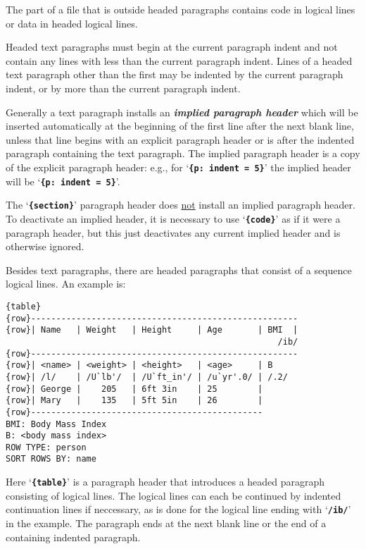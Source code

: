 \documentclass[12pt]{article}
\newcommand{\TT}[1]{{\tt \bfseries #1}}
\newcommand{\lkey}[2]{{\bf \em #1 #2}\index{#1!#2}}
\newenvironment{indpar}[1][0.3in]%
	{\begin{list}{}%
		     {\setlength{\itemsep}{0in}%
		      \setlength{\topsep}{0in}%
		      \setlength{\parsep}{1ex}%
		      \setlength{\labelwidth}{#1}%
		      \setlength{\leftmargin}{#1}%
		      \addtolength{\leftmargin}{\labelsep}}%
	 \item}%
	{\end{list}}
\begin{document}
The part of a file that is outside headed paragraphs contains code in
logical lines or data in headed logical lines.

Headed text paragraphs must begin at the current paragraph indent
and not contain any lines with less than the current paragraph indent.
Lines of a headed text paragraph other than the first may be indented
by the current paragraph indent, or by more than the current paragraph
indent.

Generally a text paragraph installs an \lkey{implied paragraph}{header}
which will be inserted automatically at the beginning of the first
line after the next blank line, unless that line begins with an
explicit paragraph header or is after the indented paragraph containing
the text paragraph.  The implied
paragraph header is a copy of the explicit paragraph header:
e.g., for `\TT{\{p:~indent = 5\}}' the implied header will
be `\TT{\{p:~indent = 5\}}'.

The `\TT{\{section\}}' paragraph
header does \underline{not} install an implied paragraph header.
To deactivate an implied header, it is necessary
to use `\TT{\{code\}}' as if it were a paragraph header, but
this just deactivates any current implied header
and is otherwise ignored.

Besides text paragraphs, there are headed paragraphs that consist
of a sequence logical lines.  An example is:
\begin{indpar}\begin{verbatim}
{table}
{row}-----------------------------------------------------
{row}| Name   | Weight   | Height     | Age       | BMI  |
                                                      /ib/
{row}-----------------------------------------------------
{row}| <name> | <weight> | <height>   | <age>     | B
{row}| /l/    | /U`lb'/  | /U`ft_in'/ | /u`yr'.0/ | /.2/
{row}| George |    205   | 6ft 3in    | 25        |
{row}| Mary   |    135   | 5ft 5in    | 26        |
{row}----------------------------------------------
BMI: Body Mass Index
B: <body mass index>
ROW TYPE: person
SORT ROWS BY: name
\end{verbatim}\end{indpar}

Here `\TT{\{table\}}' is a paragraph header that introduces
a headed paragraph consisting of logical lines.  The logical
lines can each be continued by indented continuation lines
if neccessary, as is done for the logical line ending with
`\TT{/ib/}' in the example.  The paragraph ends at the next blank line
or the end of a containing indented paragraph.
\end{document}
